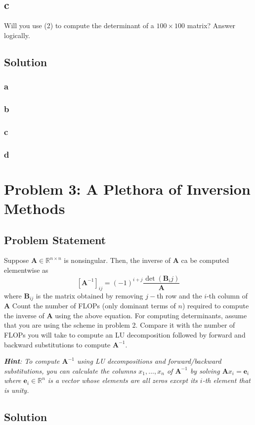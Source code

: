 \documentclass[11pt]{report}
\theoremstyle{definition}
\newcommand{\mat}[1]{\mathbf{#1}}
\begin{document}
\subsection*{c}
Will you use (2) to compute the determinant of a $100\times 100$ matrix? Answer
logically.


\subsection*{Solution}
\subsubsection*{a}

\subsubsection*{b}

\subsubsection*{c}

\subsubsection*{d}

\section*{Problem 3: A Plethora of Inversion Methods}
\subsection*{Problem Statement}
Suppose $\mat{A}\in\mathbb{R}^{n\times n}$ is nonsingular. Then, the inverse of
$\mat{A}$ ca be computed elementwise as
\[ \left[\mat{A}^{-1}\right]_{ij} = (-1)^{i+j}\frac{\det(\mat{B}_ij)}{\mat{A}} \]
where $\mat{B}_{ij}$ is the matrix obtained by removing $j-$th row and the
$i$-th column of $\mat{A}$ Count the number of FLOPs (only dominant terms of
$n$) required to compute the inverse of $\mat{A}$ using the above equation. For
computing determinants, assume that you are using the scheme in problem 2.
Compare it with the number of FLOPs you will take to compute an LU decomposition
followed by forward and backward substitutions to compute $\mat{A}^{-1}$.

\textit{
	\textbf{Hint}: To compute $\mat{A}^{-1}$ using LU decompositions and
	forward/backward substitutions, you can calculate the columns $x_1,\ldots,x_n$
	of $\mat{A}^{-1}$ by solving $\mat{A}x_i=\mat{e}_i$ where $\mat{e}_i\in\mathbb{R}^n$
	is a vector whose elements are all zeros except its $i$-th element that is unity.
}

\subsection*{Solution}

\newpage
\printbibliography
\end{document}
